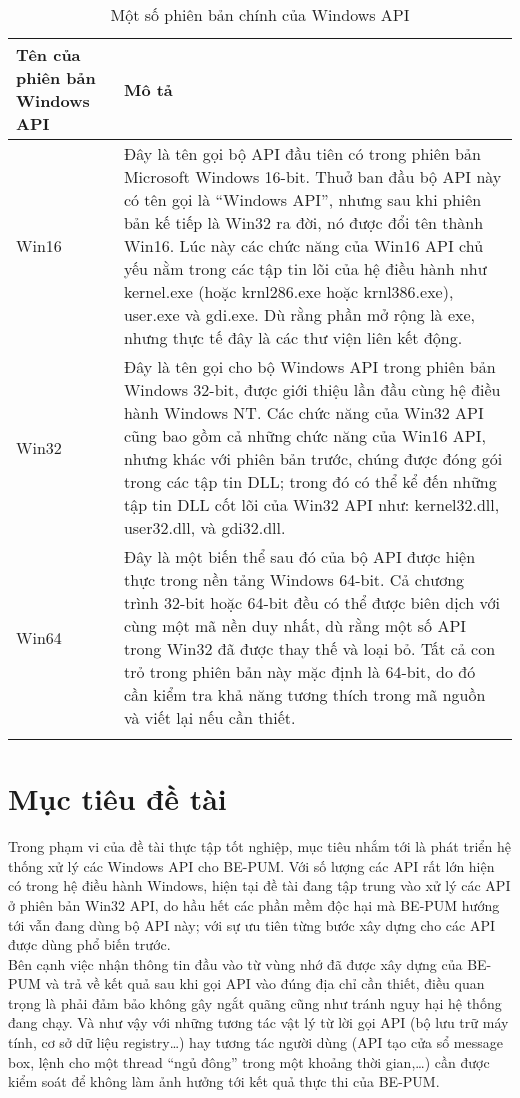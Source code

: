 \begin{longtable}{ | m{3cm} | m{11cm} | }
	\hline
Tên của phiên bản Windows API & Mô tả \\
	\hline
	\hline
Win16 & Đây là tên gọi bộ API đầu tiên có trong phiên bản Microsoft Windows 16-bit. Thuở ban đầu bộ API này có tên gọi là “Windows API”, nhưng sau khi phiên bản kế tiếp là Win32 ra đời, nó được đổi tên thành Win16. Lúc này các chức năng của Win16 API chủ yếu nằm trong các tập tin lõi của hệ điều hành như kernel.exe (hoặc krnl286.exe hoặc krnl386.exe), user.exe và gdi.exe. Dù rằng phần mở rộng là exe, nhưng thực tế đây là các thư viện liên kết động. \\
	\hline
Win32 & Đây là tên gọi cho bộ Windows API trong phiên bản Windows 32-bit, được giới thiệu lần đầu cùng hệ điều hành Windows NT. Các chức năng của Win32 API cũng bao gồm cả những chức năng của Win16 API, nhưng khác với phiên bản trước, chúng được đóng gói trong các tập tin DLL; trong đó có thể kể đến những tập tin DLL cốt lõi của Win32 API như: kernel32.dll, user32.dll, và gdi32.dll. \\
	\hline
Win64 & Đây là một biến thể sau đó của bộ API được hiện thực trong nền tảng Windows 64-bit. Cả chương trình 32-bit hoặc 64-bit đều có thể được biên dịch với cùng một mã nền duy nhất, dù rằng một số API trong Win32 đã được thay thế và loại bỏ. Tất cả con trỏ trong phiên bản này mặc định là 64-bit, do đó cần kiểm tra khả năng tương thích trong mã nguồn và viết lại nếu cần thiết. \\
	\hline

\caption[Một số phiên bản chính của Windows API]{Một số phiên bản chính của Windows API}
\label{table:tblwapiver}
\end{longtable}

\newpage
\section{Mục tiêu đề tài}

Trong phạm vi của đề tài thực tập tốt nghiệp, mục tiêu nhắm tới là phát triển hệ thống xử lý các Windows API cho BE-PUM. Với số lượng các API rất lớn hiện có trong hệ điều hành Windows, hiện tại đề tài đang tập trung vào xử lý các API ở phiên bản Win32 API, do hầu hết các phần mềm độc hại mà BE-PUM hướng tới vẫn đang dùng bộ API này; với sự ưu tiên từng bước xây dựng cho các API được dùng phổ biến trước.\\

Bên cạnh việc nhận thông tin đầu vào từ vùng nhớ đã được xây dựng của BE-PUM và trả về kết quả sau khi gọi API vào đúng địa chỉ cần thiết, điều quan trọng là phải đảm bảo không gây ngắt quãng cũng như tránh nguy hại hệ thống đang chạy.
Và như vậy với những tương tác vật lý từ lời gọi API (bộ lưu trữ máy tính, cơ sở dữ liệu registry…) hay tương tác người dùng (API tạo cửa sổ message box, lệnh cho một thread “ngủ đông” trong một khoảng thời gian,…) cần được kiểm soát để không làm ảnh hưởng tới kết quả thực thi của BE-PUM.\\

